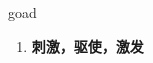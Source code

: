 
\begin{frame}
{\huge goad}
\begin{center}
\begin{enumerate}\Large
  \item \textbf{刺激，驱使，激发}
\end{enumerate}
\end{center}
\end{frame}
